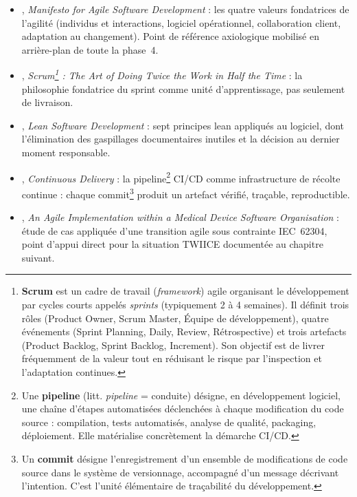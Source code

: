 \begin{itemize}
  \item \textbf{\citet{beck2001}}, \textit{Manifesto for Agile Software Development} : les quatre valeurs fondatrices de l'agilité (individus et interactions, logiciel opérationnel, collaboration client, adaptation au changement). Point de référence axiologique mobilisé en arrière-plan de toute la phase~4.
  \item \textbf{\citet{sutherland2014}}, \textit{Scrum\footnote{\textbf{Scrum} est un cadre de travail (\emph{framework}) agile organisant le développement par cycles courts appelés \emph{sprints} (typiquement 2 à 4 semaines). Il définit trois rôles (Product Owner, Scrum Master, Équipe de développement), quatre événements (Sprint Planning, Daily, Review, Rétrospective) et trois artefacts (Product Backlog, Sprint Backlog, Increment). Son objectif est de livrer fréquemment de la valeur tout en réduisant le risque par l'inspection et l'adaptation continues.\label{fn:scrum}} : The Art of Doing Twice the Work in Half the Time} : la philosophie fondatrice du sprint comme unité d'apprentissage, pas seulement de livraison.
  \item \textbf{\citet{poppendieck2003}}, \textit{Lean Software Development} : sept principes lean appliqués au logiciel, dont l'élimination des gaspillages documentaires inutiles et la décision au dernier moment responsable.
  \item \textbf{\citet{humble2010}}, \textit{Continuous Delivery} : la pipeline\footnote{Une \textbf{pipeline} (litt. \emph{pipeline} = conduite) désigne, en développement logiciel, une chaîne d'étapes automatisées déclenchées à chaque modification du code source : compilation, tests automatisés, analyse de qualité, packaging, déploiement. Elle matérialise concrètement la démarche CI/CD.} CI/CD comme infrastructure de récolte continue : chaque commit\footnote{Un \textbf{commit} désigne l'enregistrement d'un ensemble de modifications de code source dans le système de versionnage, accompagné d'un message décrivant l'intention. C'est l'unité élémentaire de traçabilité du développement.} produit un artefact vérifié, traçable, reproductible.
  \item \textbf{\citet{mchugh2014}}, \emph{An Agile Implementation within a Medical Device Software Organisation} : étude de cas appliquée d'une transition agile sous contrainte IEC~62304, point d'appui direct pour la situation TWIICE documentée au chapitre suivant.
\end{itemize}

